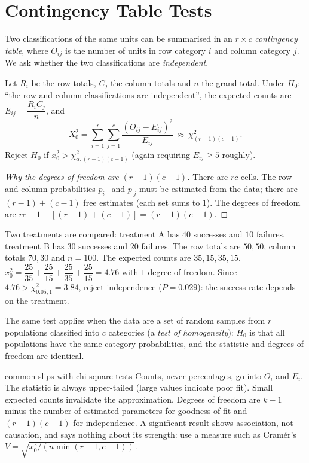 \section{Contingency Table Tests}

Two classifications of the same units can be summarised in an $r\times c$ \emph{contingency table}, where $O_{ij}$ is the number of units in row category $i$ and column category $j$. We ask whether the two classifications are \emph{independent}.

\begin{theorem}\label{thm:indep}
Let $R_i$ be the row totals, $C_j$ the column totals and $n$ the grand total. Under $H_0$: ``the row and column classifications are independent'', the expected counts are $E_{ij}=\dfrac{R_iC_j}n$, and
\[ X_0^2=\sum_{i=1}^r\sum_{j=1}^c\frac{(O_{ij}-E_{ij})^2}{E_{ij}}\ \approx\ \chi^2_{(r-1)(c-1)}. \]
Reject $H_0$ if $x_0^2>\chi^2_{\alpha,(r-1)(c-1)}$ (again requiring $E_{ij}\ge5$ roughly).
\end{theorem}

\begin{proof}[Why the degrees of freedom are $(r-1)(c-1)$]
There are $rc$ cells. The row and column probabilities $p_{i\cdot}$ and $p_{\cdot j}$ must be estimated from the data; there are $(r-1)+(c-1)$ free estimates (each set sums to $1$). The degrees of freedom are $rc-1-[(r-1)+(c-1)]=(r-1)(c-1)$.
\end{proof}

\begin{example}\label{ex:cont}
Two treatments are compared: treatment A has $40$ successes and $10$ failures, treatment B has $30$ successes and $20$ failures. The row totals are $50,50$, column totals $70,30$ and $n=100$. The expected counts are $35,15,35,15$. $x_0^2=\dfrac{25}{35}+\dfrac{25}{15}+\dfrac{25}{35}+\dfrac{25}{15}=4.76$ with $1$ degree of freedom. Since $4.76>\chi^2_{0.05,1}=3.84$, reject independence ($P=0.029$): the success rate depends on the treatment.
\end{example}

The same test applies when the data are a set of random samples from $r$ populations classified into $c$ categories (a \emph{test of homogeneity}): $H_0$ is that all populations have the same category probabilities, and the statistic and degrees of freedom are identical.

\begin{interview}{common slips with chi-square tests}
Counts, never percentages, go into $O_i$ and $E_i$. The statistic is always upper-tailed (large values indicate poor fit). Small expected counts invalidate the approximation. Degrees of freedom are $k-1$ minus the number of estimated parameters for goodness of fit and $(r-1)(c-1)$ for independence. A significant result shows association, not causation, and says nothing about its strength: use a measure such as Cram\'er's $V=\sqrt{x_0^2/(n\min(r-1,c-1))}$.
\end{interview}

